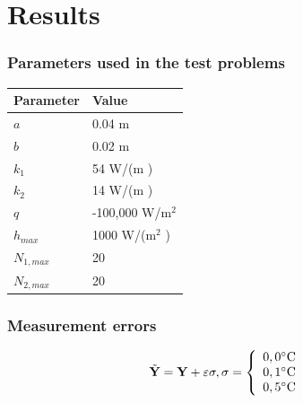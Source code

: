 \documentclass[aspectratio=169]{beamer}
\begin{document}
\section{Results}
\begin{frame}
	\frametitle{Parameters used in the test problems}
	\begin{table}[H]
		\centering
		\begin{tabular}{|l|l|}
			\hline
			\textbf{Parameter} & \textbf{Value}  \\ \hline
			$a$       & 0.04 m   \\ \hline
			$b$       & 0.02 m     \\ \hline
			$k_1$     & 54 W/(m \celsius)  \\ \hline
			$k_2$     & 14 W/(m \celsius) \\ \hline
			$q$       & -100,000 W/$\text{m}^2$ \\ \hline
			$h_{max}$       & 1000 W/($\text{m}^2$ \celsius) \\ \hline
			$N_{1,max}$       & 20 \\ \hline
			$N_{2,max}$       & 20 \\ \hline
		\end{tabular}		
		\label{tabela_params}
	\end{table}
\end{frame}
%

%
\begin{frame}
	\frametitle{Measurement errors}
	\begin{center}
		\begin{align*}
		& \tilde{\mathbf{Y}} = \mathbf{Y} + \mathbf{\varepsilon} \sigma, \sigma = 
		\left\lbrace \begin{array}{ll}
		0,0\celsius \\
		0,1\celsius \\
		0,5\celsius
		\end{array}\right .
		\end{align*}
	\end{center}
\end{frame}


%

%
\end{document}
